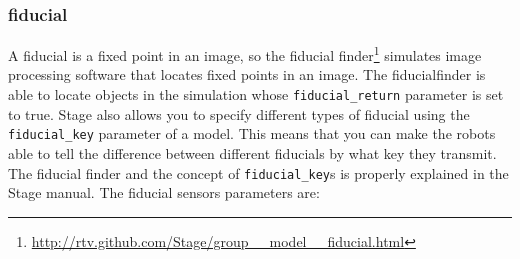 \documentclass[a4paper]{report}
\begin{document}
\subsubsection{fiducial} 
A fiducial is a fixed point in an image, so the fiducial finder\footnote{\url{http://rtv.github.com/Stage/group__model__fiducial.html}} 
simulates image processing software that locates fixed points in an image. The fiducialfinder is able to locate objects in the simulation whose \verb|fiducial_return| parameter is set to true. Stage also allows you to specify different types of fiducial using the \verb|fiducial_key| parameter of a model. 
This means that you can make the robots able to tell the difference between different fiducials by what key they transmit. The fiducial finder and the concept of \verb|fiducial_key|s is properly explained in the Stage manual. The fiducial sensors parameters are:
\end{document}
